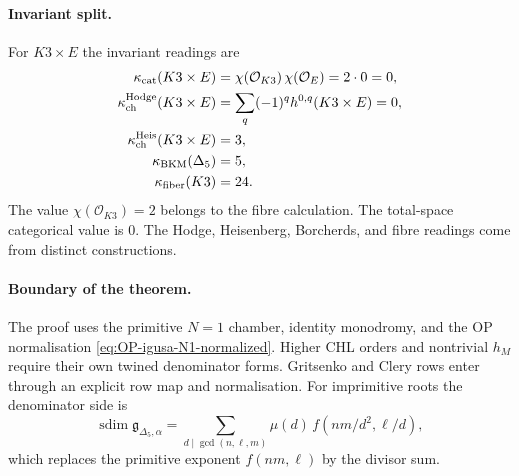 \paragraph{Invariant split.}
For \(K3\times E\) the invariant readings are
\[
\begin{aligned}
  \kappa_{\mathrm{cat}}(K3\times E)
    &=\chi(\mathcal O_{K3})\,\chi(\mathcal O_E)=2\cdot0=0,\\
  \kappa_{\mathrm{ch}}^{\mathrm{Hodge}}(K3\times E)
    &=\sum_q(-1)^qh^{0,q}(K3\times E)=0,\\
  \kappa_{\mathrm{ch}}^{\mathrm{Heis}}(K3\times E)
    &=3,\\
  \kappa_{\mathrm{BKM}}(\Delta_5)
    &=5,\\
  \kappa_{\mathrm{fiber}}(K3)
    &=24.
\end{aligned}
\]
The value \(\chi(\mathcal O_{K3})=2\) belongs to the fibre calculation.
The total-space categorical value is \(0\). The Hodge, Heisenberg,
Borcherds, and fibre readings come from distinct constructions.

\paragraph{Boundary of the theorem.}
The proof uses the primitive $N=1$ chamber, identity monodromy, and the
OP normalisation \eqref{eq:OP-igusa-N1-normalized}.  Higher CHL orders
and nontrivial $h_M$ require their own twined denominator forms.
Gritsenko and Clery rows enter through an explicit row map and
normalisation.  For imprimitive roots the denominator side is
\[
  \operatorname{sdim}\mathfrak g_{\Delta_5,\alpha}
  =
  \sum_{d\mid\gcd(n,\ell,m)}
  \mu(d)\,f(nm/d^2,\ell/d),
\]
which replaces the primitive exponent \(f(nm,\ell)\) by the divisor sum.

